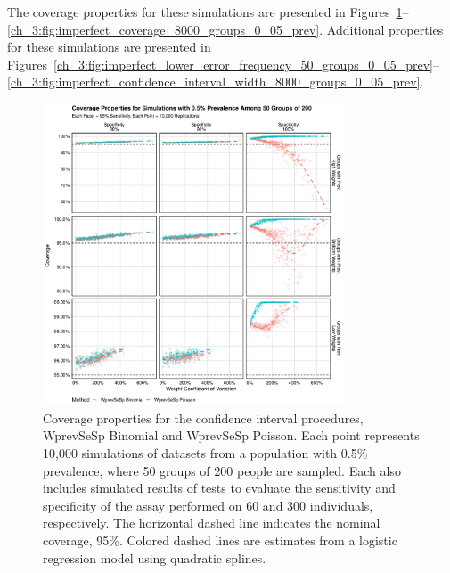 The coverage properties for these simulations are presented in Figures~\ref{ch_3:fig:imperfect_coverage_50_groups_0_005_prev}--\ref{ch_3:fig:imperfect_coverage_8000_groups_0_05_prev}.
Additional properties for these simulations are presented in Figures~\ref{ch_3:fig:imperfect_lower_error_frequency_50_groups_0_05_prev}--\ref{ch_3:fig:imperfect_confidence_interval_width_8000_groups_0_05_prev}.

\begin{figure}
\centering
\includegraphics[width=0.8\textwidth]{imperfect_coverage_50_groups_0_005_prev}
\caption{Coverage properties for the confidence interval procedures, WprevSeSp Binomial and WprevSeSp Poisson.
Each point represents 10,000 simulations of datasets from a population with 0.5\% prevalence, where 50 groups of 200 people are sampled.
Each  also includes simulated results of tests to evaluate the sensitivity and specificity of the assay performed on 60 and 300 individuals, respectively.
The horizontal dashed line indicates the nominal coverage, 95\%.
Colored dashed lines are estimates from a logistic regression model using quadratic splines.}
\label{ch_3:fig:imperfect_coverage_50_groups_0_005_prev}
\end{figure}

